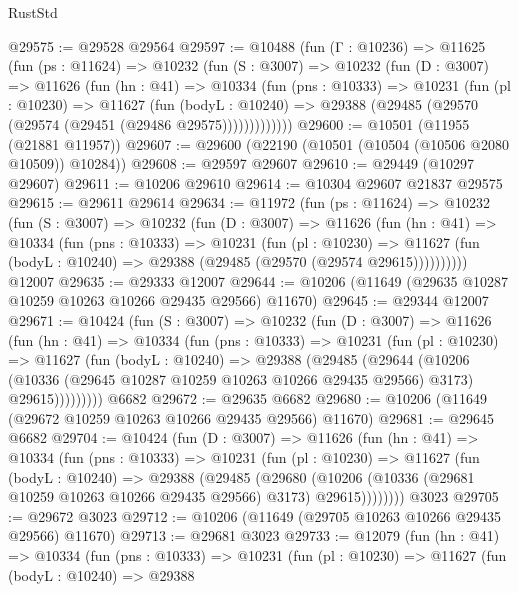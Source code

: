 \begin{lexlean}{RustStd}
\begin{coremodule}
@29575 := @29528 @29564
@29597 := @10488
    (fun (Γ : @10236) =>
    @11625
      (fun (ps : @11624) =>
      @10232
        (fun (S : @3007) =>
        @10232
          (fun (D : @3007) =>
          @11626
            (fun (hn : @41) =>
            @10334
              (fun (pns : @10333) =>
              @10231
                (fun (pl : @10230) =>
                @11627
                  (fun (bodyL : @10240) =>
                  @29388 (@29485 (@29570 (@29574 (@29451 (@29486 @29575)))))))))))))
@29600 := @10501 (@11955 (@21881 @11957))
@29607 := @29600 (@22190 (@10501 (@10504 (@10506 @2080 @10509)) @10284))
@29608 := @29597 @29607
@29610 := @29449 (@10297 @29607)
@29611 := @10206 @29610
@29614 := @10304 @29607 @21837 @29575
@29615 := @29611 @29614
@29634 := @11972
    (fun (ps : @11624) =>
    @10232
      (fun (S : @3007) =>
      @10232
        (fun (D : @3007) =>
        @11626
          (fun (hn : @41) =>
          @10334
            (fun (pns : @10333) =>
            @10231
              (fun (pl : @10230) =>
              @11627 (fun (bodyL : @10240) => @29388 (@29485 (@29570 (@29574 @29615))))))))))
    @12007
@29635 := @29333 @12007
@29644 := @10206 (@11649 (@29635 @10287 @10259 @10263 @10266 @29435 @29566) @11670)
@29645 := @29344 @12007
@29671 := @10424
    (fun (S : @3007) =>
    @10232
      (fun (D : @3007) =>
      @11626
        (fun (hn : @41) =>
        @10334
          (fun (pns : @10333) =>
          @10231
            (fun (pl : @10230) =>
            @11627
              (fun (bodyL : @10240) =>
              @29388
                (@29485
                  (@29644
                    (@10206
                      (@10336 (@29645 @10287 @10259 @10263 @10266 @29435 @29566) @3173)
                      @29615)))))))))
    @6682
@29672 := @29635 @6682
@29680 := @10206 (@11649 (@29672 @10259 @10263 @10266 @29435 @29566) @11670)
@29681 := @29645 @6682
@29704 := @10424
    (fun (D : @3007) =>
    @11626
      (fun (hn : @41) =>
      @10334
        (fun (pns : @10333) =>
        @10231
          (fun (pl : @10230) =>
          @11627
            (fun (bodyL : @10240) =>
            @29388
              (@29485
                (@29680
                  (@10206 (@10336 (@29681 @10259 @10263 @10266 @29435 @29566) @3173) @29615))))))))
    @3023
@29705 := @29672 @3023
@29712 := @10206 (@11649 (@29705 @10263 @10266 @29435 @29566) @11670)
@29713 := @29681 @3023
@29733 := @12079
    (fun (hn : @41) =>
    @10334
      (fun (pns : @10333) =>
      @10231
        (fun (pl : @10230) =>
        @11627
          (fun (bodyL : @10240) =>
          @29388

\end{coremodule}
\end{lexlean}
